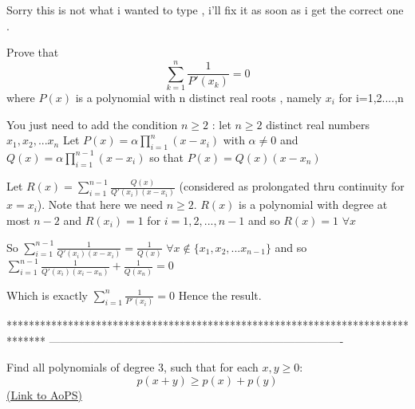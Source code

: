 \begin{solution}
	Sorry this is not what i wanted to type , i'll fix it as soon as i get the correct one .
\end{solution}



\begin{solution}
	\begin{tcolorbox}Prove that \[ \sum_{k=1}^n\frac{1}{P'(x_k)}=0 \]
where $ P(x) $ is a polynomial with n distinct real roots , namely $ x_i $ for i=1,2....,n\end{tcolorbox}
You just need to add the condition $n\ge 2$ : let $n\ge 2$ distinct real numbers $x_1,x_2,...x_n$
Let $P(x)=\alpha\prod_{i=1}^{n}(x-x_i)$ with $\alpha\ne 0$ and $Q(x)=\alpha\prod_{i=1}^{n-1}(x-x_i)$ so that $P(x)=Q(x)(x-x_{n})$ 

Let $R(x)=\sum_{i=1}^{n-1}\frac{Q(x)}{Q'(x_i)(x-x_i)}$ (considered as prolongated thru continuity for $x=x_i$). Note that here we need $n\ge 2$.
$R(x)$ is a polynomial with degree at most $n-2$ and $R(x_i)=1$ for $i=1,2,...,n-1$ and so $R(x)=1$ $\forall x$

So $\sum_{i=1}^{n-1}\frac 1{Q'(x_i)(x-x_i)}=\frac 1{Q(x)}$ $\forall x\notin\{x_1,x_2,...x_{n-1}\}$ and so $\sum_{i=1}^{n-1}\frac 1{Q'(x_i)(x_i-x_{n})}+\frac 1{Q(x_{n})}=0$

Which is exactly $\sum_{i=1}^{n}\frac 1{P'(x_i)}=0$
Hence the result.
\end{solution}
*******************************************************************************
-------------------------------------------------------------------------------

\begin{problem}
	Find all polynomials of degree 3, such that for each $x,y\geq 0$: \[p(x+y)\geq p(x)+p(y)\]
	\flushright \href{https://artofproblemsolving.com/community/c6h618613}{(Link to AoPS)}
\end{problem}



